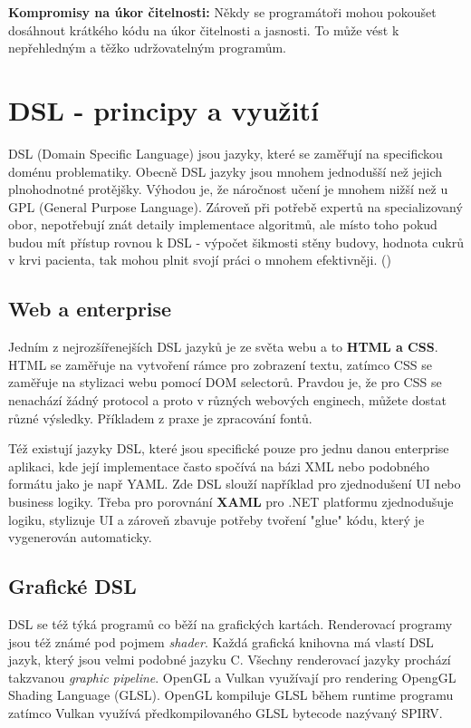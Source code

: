\documentclass[male,czech]{kithesis}
\begin{document}
\textbf{Kompromisy na úkor čitelnosti:}
Někdy se programátoři mohou pokoušet dosáhnout krátkého kódu na úkor čitelnosti a jasnosti. 
To může vést k nepřehledným a těžko udržovatelným programům.

\chapter{DSL - principy a využití}
DSL (Domain Specific Language) jsou jazyky, které se zaměřují na specifickou doménu problematiky.
Obecně DSL jazyky jsou mnohem jednodušší než jejich plnohodnotné protějšky. Výhodou je, že 
náročnost učení je mnohem nižší než u GPL (General Purpose Language). Zároveň při potřebě 
expertů na specializovaný obor, nepotřebují znát detaily 
implementace algoritmů, ale místo toho pokud budou mít přístup rovnou k DSL - výpočet šikmosti stěny budovy,
hodnota cukrů v krvi pacienta, tak mohou plnit svojí práci o mnohem efektivněji. (\cite{DomainSpecificLanguages})

\section{Web a enterprise}
Jedním z nejrozšířenejších DSL jazyků je ze světa webu a to \textbf{HTML a CSS}. HTML se zaměřuje na vytvoření rámce pro zobrazení textu,
zatímco CSS se zaměřuje na stylizaci webu pomocí DOM selectorů. Pravdou je, že pro CSS se nenachází žádný 
protocol a proto v různých webových enginech, můžete dostat různé výsledky. Příkladem z praxe je zpracování
fontů.

Též existují jazyky DSL, které jsou specifické pouze pro jednu danou enterprise aplikaci, kde její implementace
často spočívá na bázi XML nebo podobného formátu jako je např YAML. Zde DSL slouží například pro 
zjednodušení UI nebo business logiky. Třeba pro porovnání \textbf{XAML} pro .NET platformu zjednodušuje logiku, 
stylizuje UI a zároveň zbavuje potřeby tvoření "glue" kódu, který je vygenerován automaticky.

\section{Grafické DSL}
DSL se též týká programů co běží na grafických kartách. 
Renderovací programy jsou též známé pod pojmem \textit{shader}.
Každá grafická knihovna má vlastí DSL jazyk, který jsou velmi
podobné jazyku C. Všechny renderovací jazyky prochází takzvanou 
\textit{graphic pipeline}. OpenGL a Vulkan využívají pro rendering 
OpengGL Shading Language (GLSL). OpenGL kompiluje GLSL během runtime 
programu zatímco Vulkan využívá předkompilovaného GLSL bytecode nazývaný SPIRV.
\end{document}
